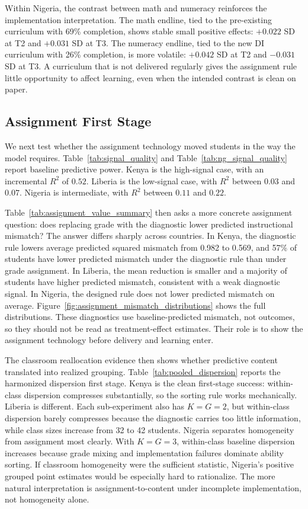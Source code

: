\documentclass[11pt]{article}
\begin{document}
Within Nigeria, the contrast between math and numeracy reinforces the implementation interpretation. The math endline, tied to the pre-existing curriculum with 69\% completion, shows stable small positive effects: $+0.022$ SD at T2 and $+0.031$ SD at T3. The numeracy endline, tied to the new DI curriculum with 26\% completion, is more volatile: $+0.042$ SD at T2 and $-0.031$ SD at T3. A curriculum that is not delivered regularly gives the assignment rule little opportunity to affect learning, even when the intended contrast is clean on paper.

\subsection{Assignment First Stage}

We next test whether the assignment technology moved students in the way the model requires. Table~\ref{tab:signal_quality} and Table~\ref{tab:ng_signal_quality} report baseline predictive power. Kenya is the high-signal case, with an incremental $R^2$ of $0.52$. Liberia is the low-signal case, with $R^2$ between $0.03$ and $0.07$. Nigeria is intermediate, with $R^2$ between $0.11$ and $0.22$.

Table~\ref{tab:assignment_value_summary} then asks a more concrete assignment question: does replacing grade with the diagnostic lower predicted instructional mismatch? The answer differs sharply across countries. In Kenya, the diagnostic rule lowers average predicted squared mismatch from 0.982 to 0.569, and 57\% of students have lower predicted mismatch under the diagnostic rule than under grade assignment. In Liberia, the mean reduction is smaller and a majority of students have higher predicted mismatch, consistent with a weak diagnostic signal. In Nigeria, the designed rule does not lower predicted mismatch on average. Figure~\ref{fig:assignment_mismatch_distributions} shows the full distributions. These diagnostics use baseline-predicted mismatch, not outcomes, so they should not be read as treatment-effect estimates. Their role is to show the assignment technology before delivery and learning enter.



The classroom reallocation evidence then shows whether predictive content translated into realized grouping. Table~\ref{tab:pooled_dispersion} reports the harmonized dispersion first stage. Kenya is the clean first-stage success: within-class dispersion compresses substantially, so the sorting rule works mechanically. Liberia is different. Each sub-experiment also has $K=G=2$, but within-class dispersion barely compresses because the diagnostic carries too little information, while class sizes increase from 32 to 42 students. Nigeria separates homogeneity from assignment most clearly. With $K=G=3$, within-class baseline dispersion increases because grade mixing and implementation failures dominate ability sorting. If classroom homogeneity were the sufficient statistic, Nigeria's positive grouped point estimates would be especially hard to rationalize. The more natural interpretation is assignment-to-content under incomplete implementation, not homogeneity alone.
\end{document}
